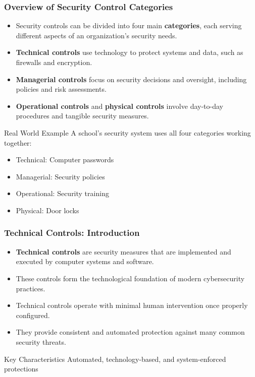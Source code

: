 \documentclass{beamer}
\begin{document}
\begin{frame}
    \frametitle{Overview of Security Control Categories}
    
    \begin{itemize}
        \item Security controls can be divided into four main \textbf{categories}, each serving different aspects of an organization's security needs.
        
        \item \textbf{Technical controls} use technology to protect systems and data, such as firewalls and encryption.
        
        \item \textbf{Managerial controls} focus on security decisions and oversight, including policies and risk assessments.
        
        \item \textbf{Operational controls} and \textbf{physical controls} involve day-to-day procedures and tangible security measures.
    \end{itemize}
    
    \begin{exampleblock}{Real World Example}
        A school's security system uses all four categories working together:
        \begin{itemize}
            \item Technical: Computer passwords
            \item Managerial: Security policies
            \item Operational: Security training
            \item Physical: Door locks
        \end{itemize}
    \end{exampleblock}
\end{frame}

\begin{frame}
    \frametitle{Technical Controls: Introduction}
    
    \begin{itemize}
        \item \textbf{Technical controls} are security measures that are implemented and executed by computer systems and software.
        
        \item These controls form the technological foundation of modern cybersecurity practices.
        
        \item Technical controls operate with minimal human intervention once properly configured.
        
        \item They provide consistent and automated protection against many common security threats.
    \end{itemize}
    
    \begin{block}{Key Characteristics}
        Automated, technology-based, and system-enforced protections
    \end{block}
\end{frame}
\end{document}
